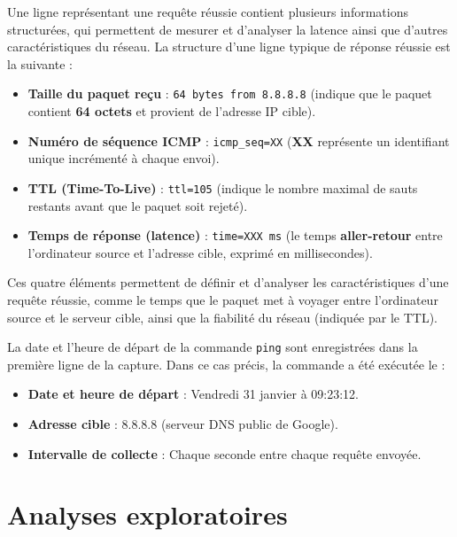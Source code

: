 Une ligne représentant une requête réussie contient plusieurs informations structurées, qui permettent de mesurer et d'analyser la latence ainsi que d'autres caractéristiques du réseau. La structure d'une ligne typique de réponse réussie est la suivante :

\begin{itemize}
	\item \textbf{Taille du paquet reçu} : \texttt{64 bytes from 8.8.8.8} (indique que le paquet contient \textbf{64 octets} et provient de l'adresse IP cible).
	\item \textbf{Numéro de séquence ICMP} : \texttt{icmp\_seq=XX} (\textbf{XX} représente un identifiant unique incrémenté à chaque envoi).
	\item \textbf{TTL (Time-To-Live)} : \texttt{ttl=105} (indique le nombre maximal de sauts restants avant que le paquet soit rejeté).
	\item \textbf{Temps de réponse (latence)} : \texttt{time=XXX ms} (le temps \textbf{aller-retour} entre l'ordinateur source et l'adresse cible, exprimé en millisecondes).
\end{itemize}

Ces quatre éléments permettent de définir et d'analyser les caractéristiques d'une requête réussie, comme le temps que le paquet met à voyager entre l'ordinateur source et le serveur cible, ainsi que la fiabilité du réseau (indiquée par le TTL).

La date et l'heure de départ de la commande \texttt{ping} sont enregistrées dans la première ligne de la capture. Dans ce cas précis, la commande a été exécutée le :

\begin{itemize}
	\item \textbf{Date et heure de départ} : Vendredi 31 janvier à 09:23:12.
	\item \textbf{Adresse cible} : 8.8.8.8 (serveur DNS public de Google).
	\item \textbf{Intervalle de collecte} : Chaque seconde entre chaque requête envoyée.
\end{itemize}

\section{Analyses exploratoires}

